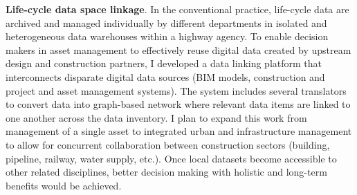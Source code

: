 \documentclass[a4paper,11pt]{article}
\begin{document}

\par
{\bf Life-cycle data space linkage}. In the conventional practice, life-cycle data are archived and managed individually by different departments in isolated and heterogeneous data warehouses within a highway agency.
%
To enable decision makers in asset management to effectively reuse digital data created by upstream design and construction partners, I developed a data linking platform that interconnects disparate digital data sources (BIM models, construction and project and asset management systems).
%
The system includes several translators to convert data into graph-based network where relevant data items are linked to one another across the data inventory. 
%
%
I plan to expand this work from management of a single asset to integrated urban and infrastructure management to allow for concurrent collaboration between construction sectors (building, pipeline, railway, water supply, etc.).
%
Once local datasets become accessible to other related disciplines, better decision making with holistic and long-term benefits would be achieved.
\end{document}
